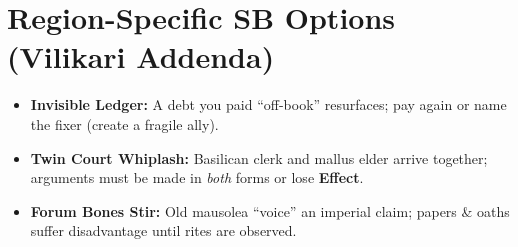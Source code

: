 \section*{Region-Specific SB Options (Vilikari Addenda)}
\begin{itemize}
\item \textbf{Invisible Ledger:} A debt you paid “off-book” resurfaces; pay again or name the fixer (create a fragile ally).
\item \textbf{Twin Court Whiplash:} Basilican clerk and mallus elder arrive together; arguments must be made in \emph{both} forms or lose \textbf{Effect}.
\item \textbf{Forum Bones Stir:} Old mausolea “voice” an imperial claim; papers \& oaths suffer disadvantage until rites are observed.
\end{itemize}